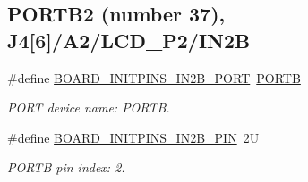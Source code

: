 \subsection*{P\+O\+R\+T\+B2 (number 37), J4\mbox{[}6\mbox{]}/\+A2/\+L\+C\+D\+\_\+\+P2/\+I\+N2B}
\begin{DoxyCompactItemize}
\item 
\mbox{\label{group__pin__mux_ga4328a0bb2a80f9f10be6168a64ca2815}} 
\#define \mbox{\hyperlink{group__pin__mux_ga4328a0bb2a80f9f10be6168a64ca2815}{B\+O\+A\+R\+D\+\_\+\+I\+N\+I\+T\+P\+I\+N\+S\+\_\+\+I\+N2\+B\+\_\+\+P\+O\+RT}}~\mbox{\hyperlink{group___p_o_r_t___peripheral___access___layer_ga09a0c85cd3da09d9cdf63a5ac4c39f77}{P\+O\+R\+TB}}
\begin{DoxyCompactList}\small\item\em P\+O\+RT device name\+: P\+O\+R\+TB. \end{DoxyCompactList}\item 
\mbox{\label{group__pin__mux_ga9fc31a6fd63b7b3516ae4af4a12817bd}} 
\#define \mbox{\hyperlink{group__pin__mux_ga9fc31a6fd63b7b3516ae4af4a12817bd}{B\+O\+A\+R\+D\+\_\+\+I\+N\+I\+T\+P\+I\+N\+S\+\_\+\+I\+N2\+B\+\_\+\+P\+IN}}~2U
\begin{DoxyCompactList}\small\item\em P\+O\+R\+TB pin index\+: 2. \end{DoxyCompactList}\end{DoxyCompactItemize}
